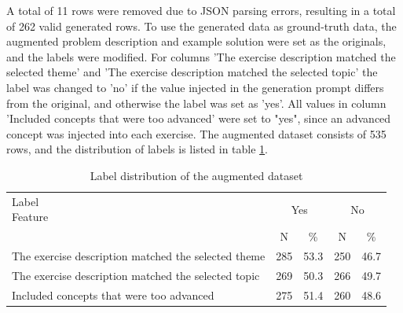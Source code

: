 \documentclass[english, 12pt, a4paper, sci, utf8, a-2b, online]{../definitions/aaltothesis}
\begin{document}
A total of 11 rows were removed due to JSON parsing errors, resulting in a total of 262 valid generated rows. To use the generated data as ground-truth data, the augmented problem description and example solution were set as the originals, and the labels were modified. For columns 'The exercise description matched the selected theme' and 'The exercise description matched the selected topic' the label was changed to 'no' if the value injected in the generation prompt differs from the original, and otherwise the label was set as 'yes'. All values in column 'Included concepts that were too advanced' were set to "yes", since an advanced concept was injected into each exercise. The augmented dataset consists of 535 rows, and the distribution of labels is listed in table \ref{tb:augmented_data}.

\begin{table}
\centering
\begin{tabularx}{\textwidth}{Xcccc}
    \toprule
    \makecell[l]{Label \\ Feature} & \multicolumn{2}{c}{Yes} & \multicolumn{2}{c}{No} \\
    & N & \% & N & \% \\
    \midrule
    The exercise description matched the selected theme & 285 & 53.3 & 250 & 46.7 \\
    The exercise description matched the selected topic & 269 & 50.3 & 266 & 49.7 \\
    Included concepts that were too advanced & 275 & 51.4 & 260 & 48.6 \\
    \bottomrule
\end{tabularx}
\caption{Label distribution of the augmented dataset}
\label{tb:augmented_data}
\end{table}
\end{document}
